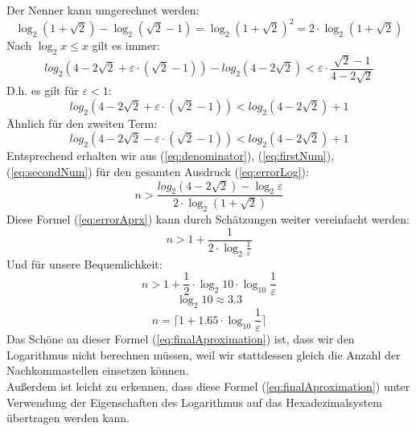 \documentclass[course=erap]{aspdoc}
\begin{document}
Der Nenner kann umgerechnet werden:
\begin{equation}\label{eq:denominator} 
\log_2{(1+\sqrt{2})}-\log_2{(\sqrt{2}-1)}=\log_2{(1+\sqrt{2})^2}=2\cdot\log_2{(1+\sqrt{2})}
\end{equation}
Nach \(\log_2{x}\leq x\) gilt es immer:
\begin{equation*}\label{eq:logx} 
log_2{(4-2\sqrt{2}+\varepsilon\cdot(\sqrt{2}-1))} - log_2{(4-2\sqrt{2})}<\varepsilon\cdot\frac{\sqrt{2}-1}{4-2\sqrt{2}}
\end{equation*}
D.h. es gilt für \(\varepsilon<1\):
\begin{equation}\label{eq:firstNum} 
log_2{(4-2\sqrt{2}+\varepsilon\cdot(\sqrt{2}-1))} < log_2{(4-2\sqrt{2})}+1
\end{equation}
Ähnlich für den zweiten Term:
\begin{equation}\label{eq:secondNum} 
log_2{(4-2\sqrt{2}-\varepsilon\cdot(\sqrt{2}-1))} < log_2{(4-2\sqrt{2})}+1
\end{equation}
Entsprechend erhalten wir aus (\ref{eq:denominator}), (\ref{eq:firstNum}), (\ref{eq:secondNum}) für den gesamten Ausdruck (\ref{eq:errorLog}):
\begin{equation}\label{eq:errorAprx} 
n>\frac{log_2{(4-2\sqrt{2})}-\log_2{\varepsilon}}{2\cdot\log_2{(1+\sqrt{2})}}
\end{equation}
Diese Formel (\ref{eq:errorAprx}) kann durch Schätzungen weiter vereinfacht werden:
\begin{equation*}\label{eq:errorAprxEasy} 
n>1+\frac{1}{2\cdot\log_2{\frac{1}{\varepsilon}}}
\end{equation*}
Und für unsere Bequemlichkeit:
\begin{equation*}
n>1+\frac{1}{2}\cdot\log_2{10}\cdot\log_{10}{\frac{1}{\varepsilon}}
\end{equation*}
\begin{equation*}
\log_2{10}\approx3.3
\end{equation*}
\begin{equation}\label{eq:finalAproximation}
n = \lceil 1+1.65\cdot\log_{10}{\frac{1}{\varepsilon}}\rceil
\end{equation}
Das Schöne an dieser Formel (\ref{eq:finalAproximation}) ist, dass wir den Logarithmus nicht berechnen müssen, weil wir stattdessen gleich die Anzahl der Nachkommastellen einsetzen können.\\
Außerdem ist leicht zu erkennen, dass diese Formel (\ref{eq:finalAproximation}) unter Verwendung der Eigenschaften des Logarithmus auf das Hexadezimalsystem übertragen werden kann.
\end{document}
